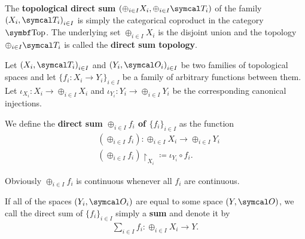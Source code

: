 \begin{definition}\label{def:topological_sum}\cite[74]{Engelking1989}
  The \textbf{topological direct sum} \( (\oplus_{i \in I} X_i, \oplus_{i \in I} \Cal{T}_i) \) of the family \( { (X_i, \Cal{T}_i) }_{i \in I} \) is simply the categorical coproduct in the category \( \Bold{Top} \). The underlying set \( \oplus_{i \in I} X_i \) is the disjoint union and the topology \( \oplus_{i \in I} \Cal{T}_i \) is called the \textbf{direct sum topology}.

  Let \( { (X_i, \Cal{T}_i) }_{i \in I} \) and \( { (Y_i, \Cal{O}_i) }_{i \in I} \) be two families of topological spaces and let \( \{ f_i: X_i \to Y_i \}_{i \in I} \) be a family of arbitrary functions between them. Let \( \iota_{X_i}: X_i \to \oplus_{i \in I} X_i \) and \( \iota_{Y_i}: Y_i \to \oplus_{i \in I} Y_i \) be the corresponding canonical injections.

  We define the \textbf{direct sum \( \oplus_{i \in I} f_i \) of \( \{ f_i \}_{i \in I} \)} as the function
  \begin{align*}
    &(\oplus_{i \in I} f_i): \oplus_{i \in I} X_i \to \oplus_{i \in I} Y_i \\
    &(\oplus_{i \in I} f_i){\restriction}_{X_i} \coloneqq \iota_{Y_i} \circ f_i.
  \end{align*}

  Obviously \( \oplus_{i \in I} f_i \) is continuous whenever all \( f_i \) are continuous.

  If all of the spaces \( (Y_i, \Cal{O}_i) \) are equal to some space \( (Y, \Cal{O}) \), we call the direct sum of \( \{ f_i \}_{i \in I} \) simply a \textbf{sum} and denote it by
  \begin{align*}
    \sum_{i \in I} f_i: \oplus_{i \in I} X_i \to Y.
  \end{align*}
\end{definition}
